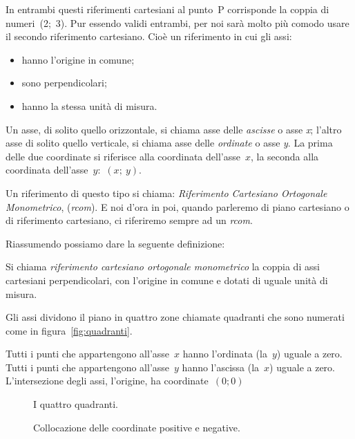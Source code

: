 In entrambi questi riferimenti cartesiani al punto~P corrisponde la coppia
di numeri~(2;~3). Pur essendo validi entrambi, per noi sarà molto più comodo 
usare il secondo riferimento cartesiano. Cioè un riferimento in cui gli assi:

\begin{itemize} [noitemsep]
 \item hanno l'origine in comune;
 \item sono perpendicolari;
 \item hanno la stessa unità di misura.
\end{itemize}

Un asse, di solito quello orizzontale, si chiama asse delle \emph{ascisse} 
o asse \emph{x}; l'altro asse di solito quello verticale, si chiama asse 
delle \emph{ordinate} o asse \emph{y}. La prima delle due coordinate
si riferisce alla coordinata dell'asse~$x$, la seconda alla coordinata 
dell'asse~$y$:~$(x;~y)$.

Un riferimento di questo tipo si chiama: 
\emph{Riferimento Cartesiano Ortogonale Monometrico}, (\emph{rcom}). 
E noi d'ora in poi, quando parleremo di piano cartesiano o di riferimento 
cartesiano, ci riferiremo sempre ad un \emph{rcom}.

Riassumendo possiamo dare la seguente definizione:

\begin{definizione}
Si chiama \emph{riferimento cartesiano ortogonale monometrico} 
la coppia di assi cartesiani perpendicolari, con l'origine in comune e 
dotati di uguale unità di misura.
\end{definizione}

Gli assi dividono il piano in quattro zone chiamate quadranti che sono 
numerati come in figura~\ref{fig:quadranti}.

Tutti i punti che appartengono all'asse~$x$ hanno l'ordinata (la~$y$) uguale 
a zero.
Tutti i punti che appartengono all'asse~$y$ hanno l'ascissa (la~$x$) uguale 
a zero.
L'intersezione degli assi, l'origine, ha coordinate~$(0; 0)$

\begin{inaccessibleblock}
 \begin{figure}[h]
 \centering
 \begin{minipage}[t]{.45\textwidth}
 \centering
 \caption{I quattro quadranti.}\label{fig:quadranti}
 \end{minipage}\hfil
 \begin{minipage}[t]{.45\textwidth}
 \centering
 \caption{Collocazione delle coordinate positive e negative.}
 \label{fig:segni}
 \end{minipage}
\end{figure}
\end{inaccessibleblock}

